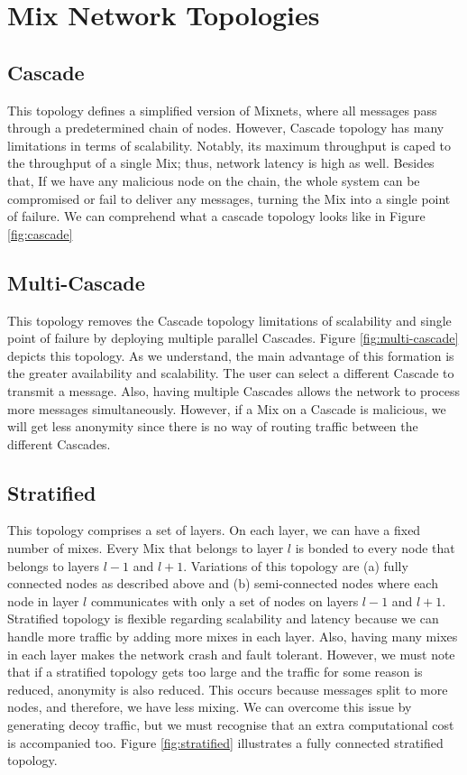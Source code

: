 \documentclass[logo,msc,cyber]{infthesis}   %
\begin{document}
\section{Mix Network Topologies}

\subsection{Cascade}
This topology defines a simplified version of Mixnets, where all messages pass
through a predetermined chain of nodes\cite{chaum1981untraceable}. However,
Cascade topology has many limitations in terms of scalability. Notably, its
maximum throughput is caped to the throughput of a single Mix; thus, network
latency is high as well. Besides that, If we have any malicious node on the
chain, the whole system can be compromised or fail to deliver any messages,
turning the Mix into a single point of failure. We can comprehend what a cascade
topology looks like in Figure \ref{fig:cascade}

\subsection{Multi-Cascade}
This topology removes the Cascade topology limitations of scalability and single
point of failure by deploying multiple parallel Cascades. Figure
\ref{fig:multi-cascade} depicts this topology. As we understand, the main
advantage of this formation is the greater availability and
scalability\cite{chaum2017cmix,gelernter2017two}. The user can select a
different Cascade to transmit a message. Also, having multiple Cascades allows
the network to process more messages simultaneously. However, if a Mix on a
Cascade is malicious, we will get less anonymity since there is no way of
routing traffic between the different Cascades.

\subsection{Stratified}
This topology comprises a set of layers. On each layer, we can have a fixed
number of mixes. Every Mix that belongs to layer $l$ is bonded to every node
that belongs to layers $l-1$ and $l+1$\cite{piotrowska2017loopix}. Variations of
this topology are (a) fully connected nodes as described above and (b)
semi-connected nodes where each node in layer $l$ communicates with only a set
of nodes on layers $l-1$ and $l+1$\cite{ben2021mixim}. Stratified topology is
flexible regarding scalability and latency because we can handle more traffic by
adding more mixes in each layer. Also, having many mixes in each layer makes the
network crash and fault tolerant\cite{erodotos}. However, we must note that if a
stratified topology gets too large and the traffic for some reason is reduced,
anonymity is also reduced. This occurs because messages split to more nodes, and
therefore, we have less mixing. We can overcome this issue by generating decoy
traffic, but we must recognise that an extra computational cost is accompanied
too. Figure \ref{fig:stratified} illustrates a fully connected stratified
topology.
\end{document}
